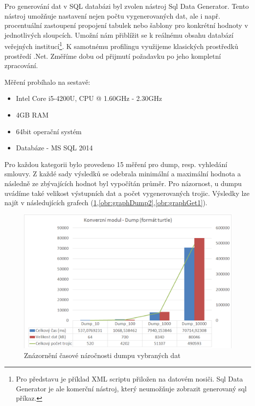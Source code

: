 Pro generování dat v SQL databázi byl zvolen nástroj Sql Data Generator. Tento nástroj umožňuje nastavení nejen počtu vygenerovaných dat, ale i např. procentuální zastoupení propojení tabulek nebo šablony pro konkrétní hodnoty v jednotlivých sloupcích. Umožní nám přiblížit se k reálnému obsahu databází veřejných institucí\footnote{Pro představu je příklad XML scriptu přiložen na datovém nosiči. Sql Data Generator je ale komerční nástroj, který neumožňuje zobrazit generovaný sql příkaz.}. K samotnému profilingu využijeme klasických prostředků prostředí .Net. Změříme dobu od přijmutí požadavku po jeho kompletní zpracování.
\newpage

Měření probíhalo na sestavě:
\begin{itemize}
\item Intel Core i5-4200U, CPU @ 1.60GHz - 2.30GHz
\item 4GB RAM
\item 64bit operační systém
\item Databáze - MS SQL 2014
\end{itemize}

Pro každou kategorii bylo provedeno 15 měření pro dump, resp. vyhledání smlouvy. Z každé sady výsledků se odebrala minimální a maximální hodnota a následně ze zbývajících hodnot byl vypočítán průměr. Pro názornost, u dumpu uvádíme také velikost výstupních dat a počet vygenerovaných trojic. Výsledky lze najít v následujících grafech (\ref{obr:graphDump1},\ref{obr:graphDump2},\ref{obr:graphGet1}).

\begin{figure}[H]
\centerline{\includegraphics[width=\textwidth]{img/graphDump1.eps}}
\caption{Znázornění časové náročnosti dumpu vybraných dat}
\label{obr:graphDump1}
\end{figure}

